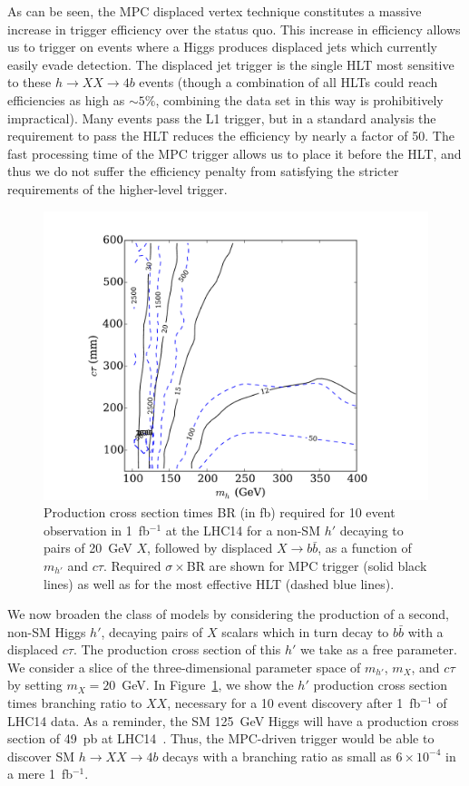 \documentclass[aps,prl,twocolumn,preprintnumbers,groupedaddress,nofootinbib]{revtex4}
\begin{document}
As can be seen, the MPC displaced vertex technique constitutes a massive increase in trigger efficiency over the status quo. This increase in efficiency allows us to trigger on events where a Higgs produces displaced jets which currently easily evade detection. The displaced jet trigger is the single HLT most sensitive to these $h\to XX \to 4b$ events (though a combination of all HLTs could reach efficiencies as high as $\sim 5\%$, combining the data set in this way is prohibitively impractical). Many events pass the L1 trigger, but in a standard analysis the requirement to pass the HLT reduces the efficiency by nearly a factor of 50. The fast processing time of the MPC trigger allows us to place it before the HLT, and thus we do not suffer the efficiency penalty from satisfying the stricter requirements of the higher-level trigger.

\begin{figure}[t]

\includegraphics[width=0.9\columnwidth]{./Eff2D.pdf}

\caption{Production cross section times BR (in fb) required for 10 event observation in 1~fb$^{-1}$ at the LHC14 for a non-SM $h'$ decaying to pairs of 20~GeV $X$, followed by displaced $X\to b\bar{b}$, as a function of $m_{h'}$ and $c\tau$. Required $\sigma \times$BR are shown for MPC trigger (solid black lines) as well as for the most effective HLT (dashed blue lines). \label{fig:massctau}}
\end{figure} 

We now broaden the class of models by considering the production of a second, non-SM Higgs $h'$, decaying pairs of $X$ scalars which in turn decay to $b\bar{b}$ with a displaced $c\tau$. The production cross section of this $h'$ we take as a free parameter. We consider a slice of the three-dimensional parameter space of $m_{h'}$, $m_X$, and $c\tau$ by setting $m_X = 20$~GeV. In Figure~\ref{fig:massctau}, we show the $h'$ production cross section times branching ratio to $XX$, necessary for a 10 event discovery after 1~fb$^{-1}$ of LHC14 data. As a reminder, the SM 125~GeV Higgs will have a production cross section of 49~pb at LHC14~\cite{Dittmaier:2011ti}. Thus, the MPC-driven trigger would be able to discover SM $h\to XX \to 4b$ decays with a branching ratio as small as  $6 \times 10^{-4}$ in a mere 1~fb$^{-1}$.
\end{document}
